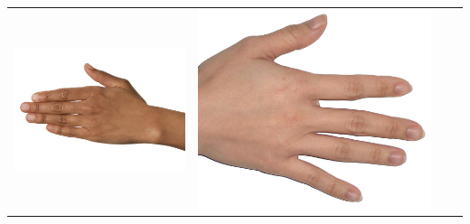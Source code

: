 \documentclass[12pt, a4paper]{article}
\begin{document}
\begin{longtable}{|c||c|c|c|}
\begin{minipage}{.29\textwidth}
    \includegraphics[width=\textwidth,height=\textheight,keepaspectratio]{../inputs/hand_brown.jpg}
  \end{minipage} & 
  \begin{minipage}{.29\textwidth}
    \includegraphics[width=\textwidth,height=\textheight,keepaspectratio]{../inputs/hand_light.jpg}
  \end{minipage} & 
  \begin{minipage}{.29\textwidth}

\end{minipage}
\end{longtable}
\end{document}
